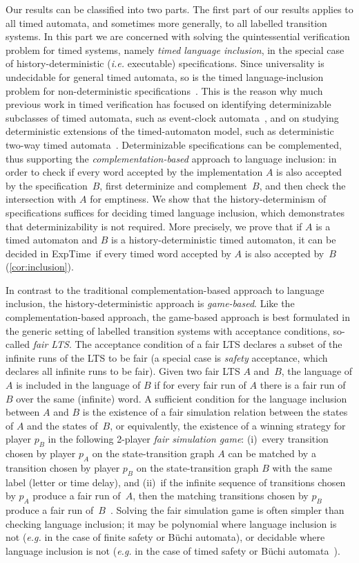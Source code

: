 \documentclass[10pt,a4paper]{amsart}
\theoremstyle{definition}
\numberwithin{equation}{section}
\newcommand{\exptime}{\EXPTIME}
\newcommand{\EXPTIME}{{\sc ExpTime}}
\begin{document}
Our results can be classified into two parts.
The first part of our results applies to all timed automata,
and sometimes more generally, to all labelled transition systems.
In this part we are concerned with solving the quintessential verification problem
for timed systems, namely \emph{timed language inclusion},
in the special case of history-deterministic (\emph{i.e.} executable) specifications.
Since universality is undecidable for general timed automata, so is the
timed language-inclusion problem for non-deterministic specifications~\cite{AD1994}.
This is the reason why much previous work in timed verification has focused on
identifying determinizable subclasses of timed automata,
such as event-clock automata~\cite{AFH99},
and on studying deterministic extensions of the timed-automaton model,
such as deterministic two-way timed automata~\cite{AlHe92}.
Determinizable specifications can be complemented, thus supporting the
\emph{complementation-based} approach to language inclusion:
in order to check if every word accepted by the implementation $A$ is also accepted
by the specification~$B$, first determinize and complement~$B$, and then check the
intersection with $A$ for emptiness.
We show that the history-determinism of specifications suffices for deciding timed
language inclusion, which demonstrates that determinizability is not required.
More precisely, we prove that if $A$ is a timed automaton and $B$ is a
history-deterministic timed automaton, it can be decided in \exptime\ if every timed
word accepted by $A$ is also accepted by~$B$ (\cref{cor:inclusion}).

In contrast to the traditional complementation-based approach to language inclusion,
the history-deterministic approach is \emph{game-based}.
Like the complementation-based approach, the game-based approach is best formulated
in the generic setting of labelled transition systems with acceptance conditions,
so-called \emph{fair LTS}.
The acceptance condition of a fair LTS declares a subset of the infinite runs of the
LTS to be fair
(a special case is \emph{safety} acceptance, which declares all infinite runs to be
fair). 
Given two fair LTS $A$ and~$B$, the language of $A$ is included in the language of $B$
if for every fair run of $A$ there is a fair run of $B$ over the same (infinite) word.
A sufficient condition for the language inclusion between $A$ and $B$ is the existence
of a fair simulation relation between the states of $A$ and the states of~$B$,
or equivalently, the existence of a winning strategy for player $p_B$ in the following
2-player \emph{fair simulation game}:
(i)~every transition chosen by player $p_A$ on the state-transition graph $A$
can be matched by a transition chosen by player $p_B$ on the state-transition graph $B$
with the same label (letter or time delay), and
(ii)~if the infinite sequence of transitions chosen by $p_A$ produce a fair run of~$A$,
then the matching transitions chosen by $p_B$ produce a fair run
of~$B$~\cite{HKR1997}.
Solving the fair simulation game is often simpler than checking language inclusion;
it may be polynomial where language inclusion is not
(\emph{e.g.} in the case of finite safety or B\"uchi automata),
or decidable where language inclusion is not
(\emph{e.g.} in the case of timed safety or B\"uchi automata~\cite{TAKB96}).
\end{document}
